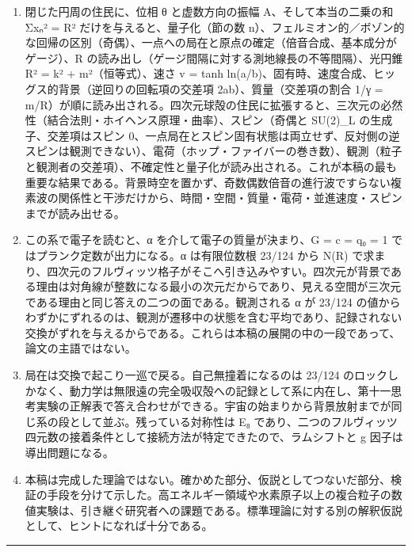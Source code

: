 \documentclass[
  a4paper,
]{ltjsarticle}
\providecommand{\tightlist}{%
  \setlength{\itemsep}{0pt}\setlength{\parskip}{0pt}}
\begin{document}
\begin{enumerate}
\def\labelenumi{\arabic{enumi}.}
\tightlist
\item
  閉じた円周の住民に、位相 θ と虚数方向の振幅 A、そして本当の二乗の和
  Σxₙ² = R² だけを与えると、量子化（節の数
  n）、フェルミオン的／ボゾン的な回帰の区別（奇偶）、一点への局在と原点の確定（倍音合成、基本成分がゲージ）、R
  の読み出し（ゲージ間隔に対する測地線長の不等間隔）、光円錐 R² = k² +
  m²（恒等式）、速さ v = tanh
  ln(a/b)、固有時、速度合成、ヒッグス的背景（逆回りの回転項の交差項
  2ab）、質量（交差項の割合 1/γ =
  m/R）が順に読み出される。四次元球殻の住民に拡張すると、三次元の必然性（結合法則・ホイヘンス原理・曲率）、スピン（奇偶と
  SU(2)\_L の生成子、交差項はスピン
  0、一点局在とスピン固有状態は両立せず、反対側の逆スピンは観測できない）、電荷（ホップ・ファイバーの巻き数）、観測（粒子と観測者の交差項）、不確定性と量子化が読み出される。これが本稿の最も重要な結果である。背景時空を置かず、奇数偶数倍音の進行波ですらない複素波の関係性と干渉だけから、時間・空間・質量・電荷・並進速度・スピンまでが読み出せる。
\item
  この系で電子を読むと、α を介して電子の質量が決まり、G = c = q₀ = 1
  ではプランク定数が出力になる。α は有限位数根 23/124 から N(R)
  で求まり、四次元のフルヴィッツ格子がそこへ引き込みやすい。四次元が背景である理由は対角線が整数になる最小の次元だからであり、見える空間が三次元である理由と同じ答えの二つの面である。観測される
  α が 23/124
  の値からわずかにずれるのは、観測が遷移中の状態を含む平均であり、記録されない交換がずれを与えるからである。これらは本稿の展開の中の一段であって、論文の主語ではない。
\item
  局在は交換で起こり一巡で戻る。自己無撞着になるのは 23/124
  のロックしかなく、動力学は無限遠の完全吸収殻への記録として系に内在し、第十一思考実験の正解表で答え合わせができる。宇宙の始まりから背景放射までが同じ系の段として並ぶ。残っている対称性は
  E₈
  であり、二つのフルヴィッツ四元数の接着条件として接続方法が特定できたので、ラムシフトと
  g 因子は導出問題になる。
\item
  本稿は完成した理論ではない。確かめた部分、仮説としてつないだ部分、検証の手段を分けて示した。高エネルギー領域や水素原子以上の複合粒子の数値実験は、引き継ぐ研究者への課題である。標準理論に対する別の解釈仮説として、ヒントになれば十分である。
\end{enumerate}

\begin{center}\rule{0.5\linewidth}{0.5pt}\end{center}
\end{document}
